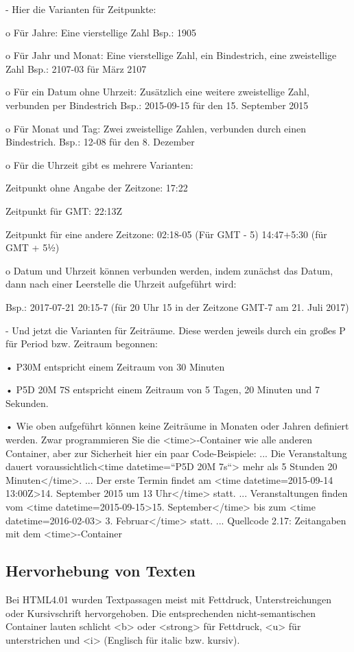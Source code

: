-	Hier die Varianten für Zeitpunkte:

o	Für Jahre: Eine vierstellige Zahl
Bsp.: 1905

o	Für Jahr und Monat: Eine vierstellige Zahl, ein Bindestrich, eine zweistellige Zahl
Bsp.: 2107-03 für März 2107

o	Für ein Datum ohne Uhrzeit: Zusätzlich eine weitere zweistellige Zahl, verbunden per Bindestrich
Bsp.: 2015-09-15 für den 15. September 2015

o	Für Monat und Tag: Zwei zweistellige Zahlen, verbunden durch einen Bindestrich.
Bsp.: 12-08 für den 8. Dezember

o	Für die Uhrzeit gibt es mehrere Varianten:

	Zeitpunkt ohne Angabe der Zeitzone:
17:22

	Zeitpunkt für GMT:
22:13Z

	Zeitpunkt für eine andere Zeitzone:
02:18-05	(Für GMT - 5)
14:47+5:30	(für GMT + 5½)

o	Datum und Uhrzeit können verbunden werden, indem zunächst das Datum, dann nach einer Leerstelle die Uhrzeit aufgeführt wird:

Bsp.: 2017-07-21 20:15-7 (für 20 Uhr 15 in der Zeitzone GMT-7 am 21. Juli 2017)

-	Und jetzt die Varianten für Zeiträume. Diese werden jeweils durch ein großes P für Period bzw. Zeitraum begonnen:

•	P30M entspricht einem Zeitraum von 30 Minuten

•	P5D 20M 7S entspricht einem Zeitraum von 5 Tagen, 20 Minuten und 7 Sekunden.

•	Wie oben aufgeführt können keine Zeiträume in Monaten oder Jahren definiert werden.
Zwar programmieren Sie die <time>-Container wie alle anderen Container, aber zur Sicherheit hier ein paar Code-Beispiele:
...
Die Veranstaltung dauert voraussichtlich<time datetime=“P5D 20M 7s“> mehr als 5 Stunden 20 Minuten</time>.
...
Der erste Termin findet am <time datetime=2015-09-14 13:00Z>14. September 2015 um 13 Uhr</time> statt.
...
Veranstaltungen finden vom <time datetime=2015-09-15>15. September</time> bis zum <time datetime=2016-02-03> 3. Februar</time> statt.
...
Quellcode 2.17: Zeitangaben mit dem <time>-Container

\subsection{Hervorhebung von Texten}

Bei HTML4.01 wurden Textpassagen meist mit Fettdruck, Unterstreichungen oder Kursivschrift hervorgehoben. Die entsprechenden nicht-semantischen Container lauten schlicht <b> oder <strong> für Fettdruck, <u> für unterstrichen und <i> (Englisch für italic bzw. kursiv). \\

